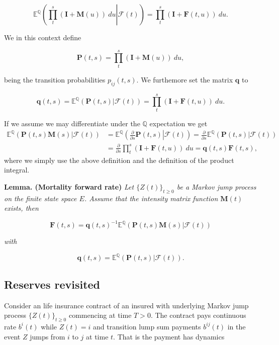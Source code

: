 \documentclass[a4paper,12pt,openany]{book}
\begin{document}
\[
\mathbb E^{\mathbb Q}\left(\left.\prod_t^s(\mathbf I+\mathbf M(u))\ du\right\vert \mathcal F (t)\right)=\prod_t^s(\mathbf I+\mathbf F(t,u))\ du.
\]

We in this context define

\[
\mathbf P(t,s)=\prod_t^s(\mathbf I+\mathbf M(u))\ du,
\]

being the transition probabilities \(p_{ij}(t,s)\). We furthemore set the matrix \(\mathbf q\) to

\[
\mathbf q(t,s)=\mathbb E^{\mathbb Q}\left(\left.\mathbf P(t,s)\right\vert \mathcal F (t)\right)=\prod_t^s(\mathbf I+\mathbf F(t,u))\ du.
\]

If we assume we may differentiate under the \(\mathbb Q\) expectation we get
\begin{align*}
\mathbb E^{\mathbb Q}\left(\left.\mathbf P(t,s)\mathbf M(s)\right\vert \mathcal F (t)\right)&=\mathbb E^{\mathbb Q}\left(\left.\frac{\partial}{\partial s}\mathbf P(t,s)\right\vert \mathcal F (t)\right)=\frac{\partial}{\partial s}\mathbb E^{\mathbb Q}\left(\left.\mathbf P(t,s)\right\vert \mathcal F (t)\right)\\
&=\frac{\partial}{\partial s}\prod_t^s(\mathbf I+\mathbf F(t,u))\ du=\mathbf q(t,s)\mathbf F(t,s),
\end{align*}
where we simply use the above definition and the definition of the product integral.

\textbf{Lemma. (Mortality forward rate)} \emph{Let \(\{Z(t)\}_{t\ge 0}\) be a Markov jump process on the finite state space \(E\). Assume that the intensity matrix function \(\mathbf M(t)\) exists, then}

\[
\mathbf F(t,s)=\mathbf q(t,s)^{-1}\mathbb E^{\mathbb Q}\left(\left.\mathbf P(t,s)\mathbf M(s)\right\vert \mathcal F (t)\right)
\]

\emph{with}

\[
\mathbf q(t,s) = \mathbb E^{\mathbb Q}\left(\left.\mathbf P(t,s)\right\vert \mathcal F (t)\right).
\]

\hypertarget{reserves-revisited}{%
\subsection{Reserves revisited}\label{reserves-revisited}}

Consider an life insurance contract of an insured with underlying Markov jump process \(\{Z(t)\}_{t\ge 0}\) commencing at time \(T>0\). The contract pays continuous rate \(b^i(t)\) while \(Z(t)= i\) and transition lump sum payments \(b^{ij}(t)\) in the event \(Z\) jumps from \(i\) to \(j\) at time \(t\). That is the payment has dynamics
\end{document}
